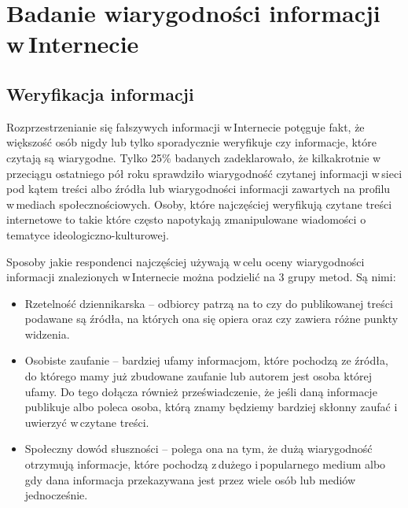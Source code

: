 \newpage
\section{Badanie wiarygodności informacji w\,Internecie} \label{badanie-wiarygodnosci-w-internecie}
\subsection{Weryfikacja informacji}
Rozprzestrzenianie się fałszywych informacji w\,Internecie potęguje fakt, że większość osób nigdy lub tylko sporadycznie weryfikuje czy informacje, które czytają są wiarygodne. Tylko 25\% badanych zadeklarowało, że kilkakrotnie w\,przeciągu ostatniego pół roku sprawdziło wiarygodność czytanej informacji w\,sieci pod kątem treści albo źródła lub wiarygodności informacji zawartych na profilu w\,mediach społecznościowych\cite{NASKBezpieczneWybory2019}. Osoby, które najczęściej weryfikują czytane treści internetowe to takie które często napotykają zmanipulowane wiadomości o tematyce ideologiczno-kulturowej.
\par
Sposoby jakie respondenci najczęściej używają w\,celu oceny wiarygodności informacji znalezionych w\,Internecie można podzielić na 3 grupy metod. Są nimi:
\begin{itemize}
    \item Rzetelność dziennikarska – odbiorcy patrzą na to czy do publikowanej treści podawane są źródła, na których ona się opiera oraz czy zawiera różne punkty widzenia. 
    \item Osobiste zaufanie – bardziej ufamy informacjom, które pochodzą ze źródła, do którego mamy już zbudowane zaufanie lub autorem jest osoba której ufamy. Do tego dołącza również przeświadczenie, że jeśli daną informacje publikuje albo poleca osoba, którą znamy będziemy bardziej skłonny zaufać i\,uwierzyć w\,czytane treści.
    \item Społeczny dowód słuszności – polega ona na tym, że dużą wiarygodność otrzymują informacje, które pochodzą z\,dużego i\,popularnego medium albo gdy dana informacja przekazywana jest przez wiele osób lub mediów jednocześnie.   
\end{itemize}

